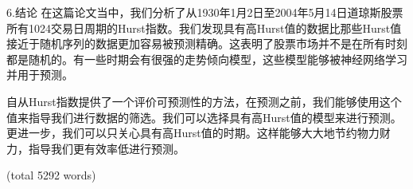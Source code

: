 \documentclass[12pt]{article}
\begin{document}
6.结论
在这篇论文当中，我们分析了从1930年1月2日至2004年5月14日道琼斯股票所有1024交易日周期的Hurst指数。我们发现具有高Hurst值的数据比那些Hurst值接近于随机序列的数据更加容易被预测精确。这表明了股票市场并不是在所有时刻都是随机的。有一些时期会有很强的走势倾向模型，这些模型能够被神经网络学习并用于预测。

自从Hurst指数提供了一个评价可预测性的方法，在预测之前，我们能够使用这个值来指导我们进行数据的筛选。我们可以选择具有高Hurst值的模型来进行预测。更进一步，我们可以只关心具有高Hurst值的时期。这样能够大大地节约物力财力，指导我们更有效率低进行预测。

(total 5292 words)






\end{document}
